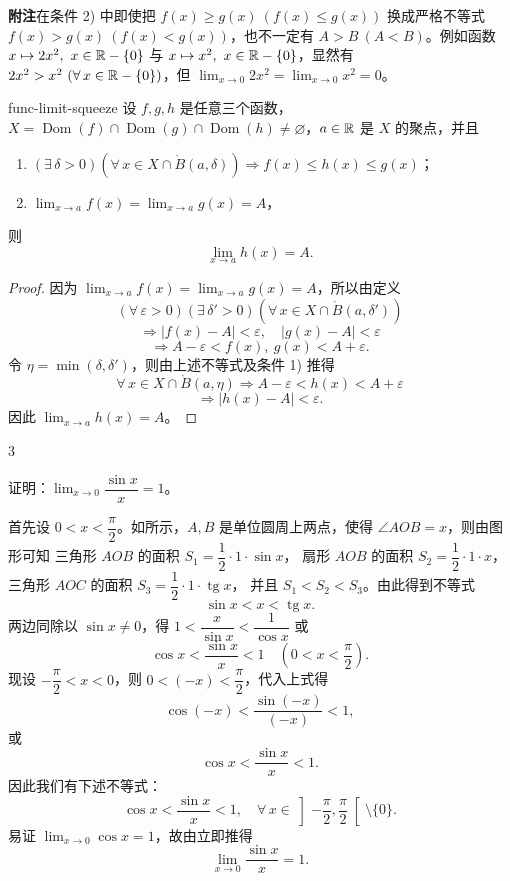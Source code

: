 \textbf{附注}\quad 在条件 2) 中即使把 \(f(x)\ge g(x)\ (f(x)\le g(x))\) 换成严格不等式 \(f(x)>g(x)\ (f(x)<g(x))\)，也不一定有 \(A>B\ (A<B)\)。例如函数 \(x\mapsto2x^2,\ x\in\mathbb{R}-\{0\}\) 与 \(x\mapsto x^2,\ x\in\mathbb{R}-\{0\}\)，显然有 \(2x^2>x^2\ (\forall\,x\in\mathbb{R}-\{0\})\)，但 \(\lim_{x\to0}2x^2=\lim_{x\to0}x^2=0\)。

\begin{myproperty}{}{func-limit-squeeze}
	设 \(f,g,h\) 是任意三个函数，\(X=\operatorname{Dom}(f)\cap\operatorname{Dom}(g)\cap\operatorname{Dom}(h)\neq\varnothing\)，\(a\in\mathbb{R}\) 是 \(X\) 的聚点，并且
	\begin{enumerate}[label=\arabic*)]
		\item \((\exists\,\delta>0)(\forall\,x\in X\cap\mathring{B}(a,\delta))\Longrightarrow f(x)\le h(x)\le g(x)\)；
		\item \(\lim_{x\to a}f(x)=\lim_{x\to a}g(x)=A\)，
	\end{enumerate}
	则
	\[
	\lim_{x\to a}h(x)=A.
	\]
\end{myproperty}

\begin{proof}
	因为 \(\lim_{x\to a}f(x)=\lim_{x\to a}g(x)=A\)，所以由定义
	\[
	(\forall\,\varepsilon>0)(\exists\,\delta'>0)(\forall\,x\in X\cap\mathring{B}(a,\delta'))
	\]
	\[
	\Longrightarrow |f(x)-A|<\varepsilon,\quad |g(x)-A|<\varepsilon
	\]
	\[
	\Longrightarrow A-\varepsilon<f(x),\ g(x)<A+\varepsilon.
	\]
	令 \(\eta=\min(\delta,\delta')\)，则由上述不等式及条件 1) 推得
	\[
	\forall\,x\in X\cap\mathring{B}(a,\eta)\Longrightarrow A-\varepsilon<h(x)<A+\varepsilon
	\]
	\[
	\Longrightarrow |h(x)-A|<\varepsilon.
	\]
	因此 \(\lim_{x\to a}h(x)=A\)。
\end{proof}

\begin{sourceexample}{3}

	证明：\(\lim_{x\to0}\dfrac{\sin x}{x}=1\)。

	首先设 \(0<x<\dfrac\pi2\)。如所示，\(A,B\) 是单位圆周上两点，使得 \(\angle AOB=x\)，则由图形可知
	三角形 \(AOB\) 的面积 \(S_1=\dfrac12\cdot1\cdot\sin x\)，
	扇形 \(AOB\) 的面积 \(S_2=\dfrac12\cdot1\cdot x\)，
	三角形 \(AOC\) 的面积 \(S_3=\dfrac12\cdot1\cdot\operatorname{tg}x\)，
	并且 \(S_1<S_2<S_3\)。由此得到不等式
	\[
	\sin x<x<\operatorname{tg}x.
	\]
	两边同除以 \(\sin x\neq0\)，得 \(1<\dfrac{x}{\sin x}<\dfrac1{\cos x}\) 或
	\[
	\cos x<\frac{\sin x}{x}<1\quad\left(0<x<\frac\pi2\right).
	\]
	现设 \(-\dfrac\pi2<x<0\)，则 \(0<(-x)<\dfrac\pi2\)，代入上式得
	\[
	\cos(-x)<\frac{\sin(-x)}{(-x)}<1,
	\]
	或
	\[
	\cos x<\frac{\sin x}{x}<1.
	\]
	因此我们有下述不等式：
	\[
	\cos x<\frac{\sin x}{x}<1,\quad \forall\,x\in\left]-\frac\pi2,\frac\pi2\right[\setminus\{0\}.
	\]
	易证 \(\lim_{x\to0}\cos x=1\)，故由立即推得
	\[
	\lim_{x\to0}\frac{\sin x}{x}=1.
	\]

\end{sourceexample}

